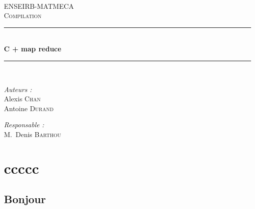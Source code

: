 \documentclass[a4paper,12pt]{article}
\begin{document}
\begin{titlepage}


\begin{center}

~\\[3.0cm]

\textsc{\LARGE ENSEIRB-MATMECA}\\[1.5cm]

\textsc{\Large  Compilation}\\[1.5cm]

\hrule ~\\[0.4cm]
{\huge \bfseries  C + map reduce}\\[0.4cm]
\hrule ~\\[1.5cm]

\begin{minipage}[t]{0.4\textwidth}
  \begin{flushleft} \large
    \emph{Auteurs :}\\
    Alexis \textsc{Chan}\\
    Antoine \textsc{Durand}
  \end{flushleft}
\end{minipage}
\begin{minipage}[t]{0.5\textwidth}
  \begin{flushright} \large
    \emph{Responsable :} \\
    M.~Denis \textsc{Barthou} \\

  \end{flushright}
\end{minipage}

\end{center}

\end{titlepage}

\newpage
\section{ccccc}

\subsection{Bonjour}
\end{document}
